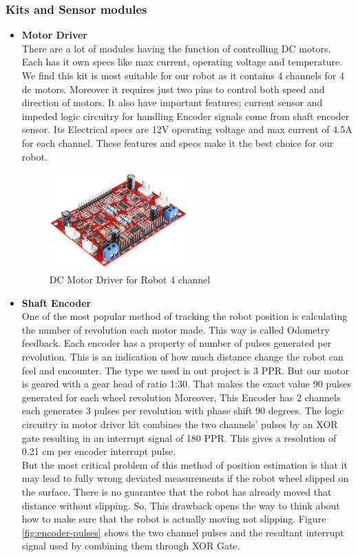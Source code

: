 \documentclass[12pt]{article}
\begin{document}
\subsubsection{Kits and Sensor modules}
\begin{itemize}
	\item \textbf{Motor Driver}\\
	There are a lot of modules having the function of controlling DC motors. Each has it own specs like max current, operating voltage and temperature. We find this kit is most suitable for our robot as it contains 4 channels for 4 dc motors. Moreover it requires just two pins to control both speed and direction of motors. It also have important features; current sensor and impeded logic circuitry for handling Encoder signals come from shaft encoder sensor.
	Its Electrical specs are 12V operating voltage and max current of 4.5A for each channel. These features and specs make it the best choice for our robot.
	
	
	\begin{figure}
		\centering
		\includegraphics[width =0.5\textwidth]{Fig/Electronics/motor-driver.jpg}
		\caption{DC Motor Driver for Robot 4 channel}
		\label{fig:motor-driver}
	\end{figure}

	\item \textbf{Shaft Encoder}\\
	One of the most popular method of tracking the robot position is calculating the number of revolution each motor made. This way is called Odometry feedback. Each encoder has a property of number of pulses generated per revolution. This is an indication of how much distance change the robot can feel and encounter. The type we used in out project is 3 PPR. But our motor is geared with a gear head of ratio 1:30. That makes the exact value 90 pulses generated for each wheel revolution  Moreover, This Encoder has 2 channels each generates 3 pulses per revolution with phase shift 90 degrees. The logic circuitry in motor driver kit combines the two channels' pulses by an XOR gate resulting in an interrupt signal of 180 PPR. This gives a resolution of 0.21 cm per encoder interrupt pulse.\\ 
	But the most critical problem of this method of position estimation is that it may lead to fully wrong deviated measurements if the robot wheel slipped on the surface. There is no guarantee that the robot has already moved that distance without slipping. So, This drawback opens the way to think about how to make sure that the robot is actually moving not slipping.
	Figure \ref{fig:encoder-pulses} shows the two channel pulses and the resultant interrupt signal used by combining them through XOR Gate.\\
	

\end{itemize}
\end{document}
